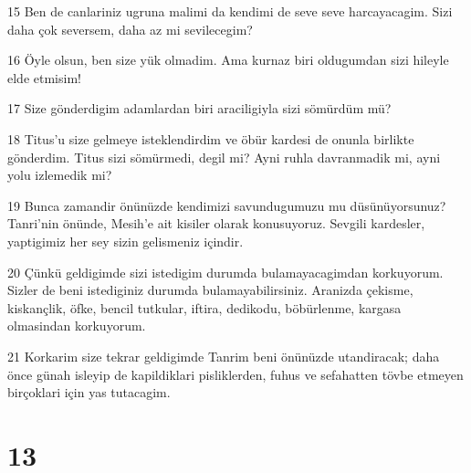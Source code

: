 \par 15 Ben de canlariniz ugruna malimi da kendimi de seve seve harcayacagim. Sizi daha çok seversem, daha az mi sevilecegim?
\par 16 Öyle olsun, ben size yük olmadim. Ama kurnaz biri oldugumdan sizi hileyle elde etmisim!
\par 17 Size gönderdigim adamlardan biri araciligiyla sizi sömürdüm mü?
\par 18 Titus'u size gelmeye isteklendirdim ve öbür kardesi de onunla birlikte gönderdim. Titus sizi sömürmedi, degil mi? Ayni ruhla davranmadik mi, ayni yolu izlemedik mi?
\par 19 Bunca zamandir önünüzde kendimizi savundugumuzu mu düsünüyorsunuz? Tanri'nin önünde, Mesih'e ait kisiler olarak konusuyoruz. Sevgili kardesler, yaptigimiz her sey sizin gelismeniz içindir.
\par 20 Çünkü geldigimde sizi istedigim durumda bulamayacagimdan korkuyorum. Sizler de beni istediginiz durumda bulamayabilirsiniz. Aranizda çekisme, kiskançlik, öfke, bencil tutkular, iftira, dedikodu, böbürlenme, kargasa olmasindan korkuyorum.
\par 21 Korkarim size tekrar geldigimde Tanrim beni önünüzde utandiracak; daha önce günah isleyip de kapildiklari pisliklerden, fuhus ve sefahatten tövbe etmeyen birçoklari için yas tutacagim.

\chapter{13}

